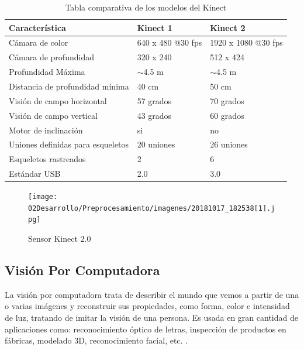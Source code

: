 \begin{table}[!htb]
	\centering
	\caption{Tabla comparativa de los modelos del Kinect}
	\label{tab:Kinect}
	\begin{tabular}{lll}
		\hline
		Característica                    & Kinect 1          & Kinect 2            \\ \hline
		Cámara de color                   & 640 x 480 @30 fps & 1920 x 1080 @30 fps \\
		Cámara de profundidad             & 320 x 240         & 512 x 424           \\
		Profundidad Máxima                & $\sim$4.5 m       & $\sim$4.5 m         \\
		Distancia de profundidad mínima   & 40 cm             & 50 cm               \\
		Visión de campo horizontal        & 57 grados         & 70 grados           \\
		Visión de campo vertical          & 43 grados         & 60 grados           \\
		Motor de inclinación              & si                & no                  \\
		Uniones definidas para esqueletos & 20 uniones        & 26 uniones          \\
		Esqueletos rastreados             & 2                 & 6                   \\
		Estándar USB                      & 2.0               & 3.0                 \\ \hline
	\end{tabular}%
\end{table}

\begin{figure}[!htb]
	\centering
	\texttt{[image: 02Desarrollo/Preprocesamiento/imagenes/20181017\_182538[1].jpg]}
	\caption{Sensor Kinect 2.0} 
	\label{fig:kinect}
\end{figure}



\subsection{Visión Por Computadora}

La visión por computadora trata de describir el mundo que vemos a partir de una o varias imágenes y reconstruir sus propiedades, como forma, color e intensidad de luz, tratando de imitar la visión de una persona. Es usada en gran cantidad de aplicaciones como: reconocimiento óptico de letras, inspección de productos en fábricas, modelado 3D, reconocimiento facial, etc. \cite{CompVisionSpringer}.\\

